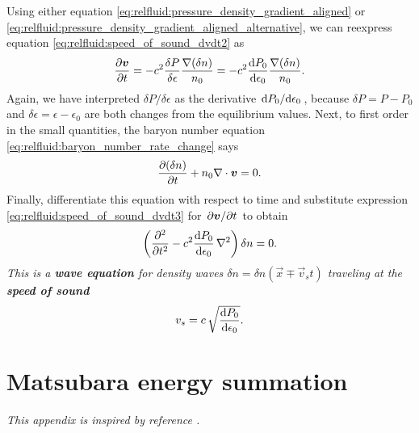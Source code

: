 Using either equation \eqref{eq:relfluid:pressure_density_gradient_aligned} or \eqref{eq:relfluid:pressure_density_gradient_aligned_alternative}, we can reexpress equation \eqref{eq:relfluid:speed_of_sound_dvdt2} as
\begin{equation}
	\pdv{\vec{v}}{t} = -c^2 \frac{\delta P}{\delta \epsilon} \frac{\nabla (\delta n)}{n_0}
	                 = -c^2 \odv{P_0}{\epsilon_0} \frac{\nabla (\delta n)}{n_0} .
\label{eq:relfluid:speed_of_sound_dvdt3}
\end{equation}
Again, we have interpreted $\delta P / \delta \epsilon$ as the derivative $\odv{P_0}/{\epsilon_0}$, because $\delta P = P - P_0$ and $\delta \epsilon = \epsilon - \epsilon_0$ are both changes from the equilibrium values.
Next, to first order in the small quantities, the baryon number equation \eqref{eq:relfluid:baryon_number_rate_change} says
\begin{equation}
	\pdv{(\delta n)}{t} + n_0 \nabla \cdot {\bm{v}} = 0 .
\label{eq:relfluid:speed_of_sound_baryon_number_rate_of_change}
\end{equation}
Finally, differentiate this equation with respect to time and substitute expression \eqref{eq:relfluid:speed_of_sound_dvdt3} for $\pdv{{\bm{v}}}/{t}$ to obtain
\begin{equation}
	\left( \pdv[2]{}{t} - c^2 \odv{P_0}{\epsilon_0} \, \nabla^2 \right) \delta n = 0 .
\end{equation}
\emph{This is a \textbf{wave equation} for density waves $\delta n = \delta n (\vec{x} \mp \vec{v}_s t)$ traveling at the \textbf{speed of sound}}
\begin{equation}
	v_s = c \, \sqrt{\odv{P_0}{\epsilon_0}} .
\label{eq:relfluid:speed_of_sound}
\end{equation}


\chapter{Matsubara energy summation}
\label{chap:matsum}

\textit{This appendix is inspired by reference \cite{ref:altland_simons}.}

